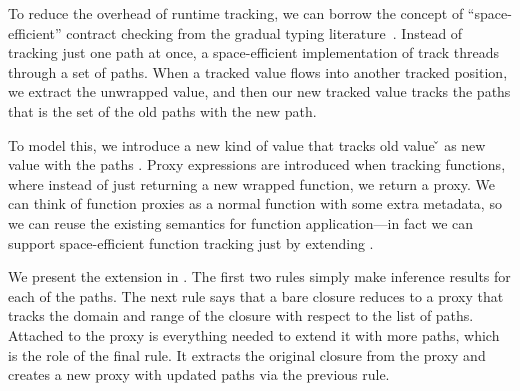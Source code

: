 \label{infer:sec:space-effecient-tracking}

To reduce the overhead of runtime tracking, we can borrow
the concept of ``space-efficient'' contract checking from
the gradual typing literature~\cite{Herman:2010}.
%
Instead of tracking just one path at once, a space-efficient
implementation of track threads through a set of paths.
When a tracked value flows into another tracked position,
we extract the unwrapped value, and then our new tracked value
tracks the paths that is the set of the old paths with the new path.

To model this, we introduce a new kind of value \ProxyV{\v{}}{\closure{\e{}}{\openv{}}}{\ova{\inferpath{}}}
that tracks old value \v{} as new value \closure{\e{}}{\openv{}} with the paths \ova{\inferpath{}}.
Proxy expressions are introduced when tracking functions, where instead of just returning
a new wrapped function, we return a proxy.
We can think of function proxies as a normal function with some extra metadata, so we
can reuse the existing semantics for function application---in fact we
can support space-efficient function tracking just by extending \trackEOp{}.

We present the extension in .
The first two \trackEOp{} rules simply make inference
results for each of the paths.
The next rule says that a bare closure
reduces to a proxy that tracks the domain and range
of the closure with respect to the list of paths.
Attached to the proxy is everything needed to extend
it with more paths, which is the role of the
final rule. It extracts the original closure from the
proxy and creates a new proxy with updated paths
via the previous rule.


